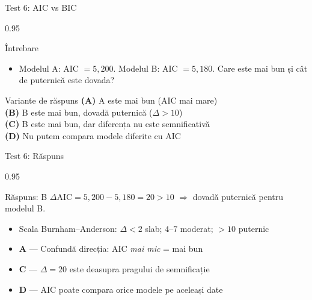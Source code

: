 \documentclass[9pt, aspectratio=169, t]{beamer}
\begin{document}
\begin{frame}{Test 6: AIC vs BIC}
\begin{cminipage}{0.95\textwidth}
    \begin{alertblock}{Întrebare}
        \begin{itemize}\setlength{\itemsep}{0pt}
            \item Modelul A: AIC $= 5{,}200$. Modelul B: AIC $= 5{,}180$. Care este mai bun și cât de puternică este dovada?
        \end{itemize}
    \end{alertblock}

    \vspace{0.3cm}

    \begin{block}{Variante de răspuns}
        \textcolor{MainBlue}{\textbf{(A)}} A este mai bun (AIC mai mare)\\[3pt]
        \textcolor{MainBlue}{\textbf{(B)}} B este mai bun, dovadă puternică ($\Delta > 10$)\\[3pt]
        \textcolor{MainBlue}{\textbf{(C)}} B este mai bun, dar diferența nu este semnificativă\\[3pt]
        \textcolor{MainBlue}{\textbf{(D)}} Nu putem compara modele diferite cu AIC
    \end{block}
\end{cminipage}
\end{frame}

\begin{frame}{Test 6: Răspuns}
\begin{cminipage}{0.95\textwidth}
    \begin{exampleblock}{Răspuns: B}
        $\Delta\text{AIC} = 5{,}200 - 5{,}180 = 20 > 10$ $\Rightarrow$ dovadă puternică pentru modelul B.
    \end{exampleblock}

    \vspace{0.2cm}

    \begin{itemize}\setlength{\itemsep}{0pt}
        \item Scala Burnham--Anderson: $\Delta < 2$ slab; $4$--$7$ moderat; $> 10$ puternic
        \item \textbf{A} --- Confundă direcția: AIC \textit{mai mic} = mai bun \incorrect
        \item \textbf{C} --- $\Delta = 20$ este deasupra pragului de semnificație \incorrect
        \item \textbf{D} --- AIC poate compara orice modele pe aceleași date \incorrect
    \end{itemize}
\end{cminipage}
\end{frame}
\end{document}
